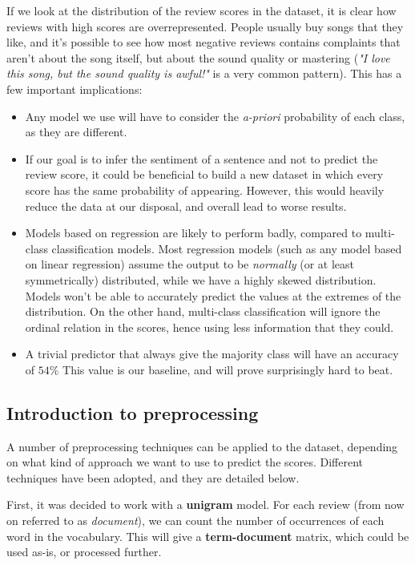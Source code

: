 \documentclass[
12pt,
a4paper,
oneside,
headinclude,
footinclude]{article}
\theoremstyle{definition} %
\begin{document}
\newpage
If we look at the distribution of the review scores in the dataset, it is clear how reviews with high scores are overrepresented.
People usually buy songs that they like, and it's possible to see how most negative reviews contains complaints that aren't about the song itself, but about the sound quality or mastering (\textit{"I love this song, but the sound quality is awful!"} is a very common pattern).  This has a few important implications:

\begin{itemize}
    \item Any model we use will have to consider the \textit{a-priori} probability of each class, as they are different.
    \item If our goal is to infer the sentiment of a sentence and not to predict the review score, it could be beneficial to build a new dataset in which every score has the same probability of appearing. However, this would heavily reduce the data at our disposal, and overall lead to worse results.
    \item Models based on regression are likely to perform badly, compared to multi-class classification models. Most regression models (such as any model based on linear regression) assume the output to be \textit{normally} (or at least symmetrically) distributed, while we have a highly skewed distribution. Models won't be able to accurately predict the values at the extremes of the distribution. On the other hand, multi-class classification will ignore the ordinal relation in the scores, hence using less information that they could.
    \item A trivial predictor that always give the majority class will have an accuracy of $54\%$ This value is our baseline, and will prove surprisingly hard to beat.
\end{itemize}

\subsection{Introduction to preprocessing}
A number of preprocessing techniques can be applied to the dataset, depending on what kind of approach we want to use to predict the scores. Different techniques have been adopted, and they are detailed below.

First, it was decided to work with a \textbf{unigram} model. For each review (from now on referred to as \textit{document}), we can count the number of occurrences of each word in the vocabulary. This will give a \textbf{term-document} matrix, which could be used as-is, or processed further.
\end{document}
